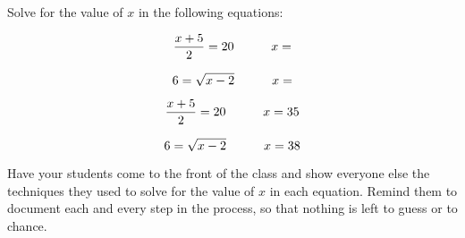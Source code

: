 

Solve for the value of $x$ in the following equations:

$${{x + 5} \over 2} = 20 \hbox{\hskip 30pt} x = $$

\vskip 10pt

$$6 = \sqrt{x - 2} \hbox{\hskip 30pt} x = $$







$${{x + 5} \over 2} = 20 \hbox{\hskip 30pt} x = 35$$

$$6 = \sqrt{x - 2} \hbox{\hskip 30pt} x = 38$$







Have your students come to the front of the class and show everyone else the techniques they used to solve for the value of $x$ in each equation.  Remind them to document each and every step in the process, so that nothing is left to guess or to chance.




